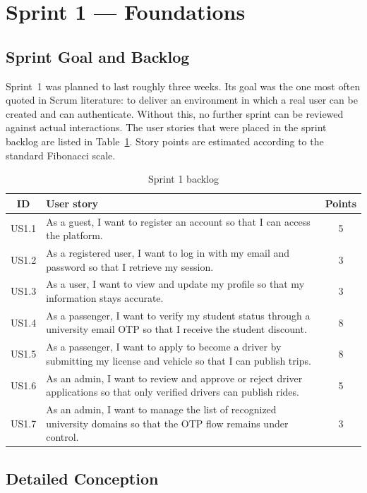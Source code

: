 \section{Sprint 1 --- Foundations}

\subsection{Sprint Goal and Backlog}

Sprint~1 was planned to last roughly three weeks. Its goal was the one most often quoted in Scrum literature: to deliver an environment in which a real user can be created and can authenticate. Without this, no further sprint can be reviewed against actual interactions. The user stories that were placed in the sprint backlog are listed in Table~\ref{tab:sprint1_backlog}. Story points are estimated according to the standard Fibonacci scale.

\begin{table}[H]
\centering
\caption{Sprint 1 backlog}
\label{tab:sprint1_backlog}
\begin{tabular}{|c|p{8.5cm}|c|}
\hline
\textbf{ID} & \textbf{User story} & \textbf{Points} \\
\hline
US1.1 & As a guest, I want to register an account so that I can access the platform. & 5 \\
\hline
US1.2 & As a registered user, I want to log in with my email and password so that I retrieve my session. & 3 \\
\hline
US1.3 & As a user, I want to view and update my profile so that my information stays accurate. & 3 \\
\hline
US1.4 & As a passenger, I want to verify my student status through a university email OTP so that I receive the student discount. & 8 \\
\hline
US1.5 & As a passenger, I want to apply to become a driver by submitting my license and vehicle so that I can publish trips. & 8 \\
\hline
US1.6 & As an admin, I want to review and approve or reject driver applications so that only verified drivers can publish rides. & 5 \\
\hline
US1.7 & As an admin, I want to manage the list of recognized university domains so that the OTP flow remains under control. & 3 \\
\hline
\end{tabular}
\end{table}

\subsection{Detailed Conception}

